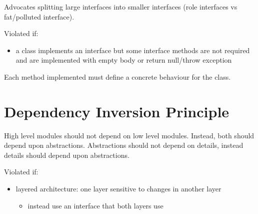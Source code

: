 \documentclass[11pt]{article}
\begin{document}
Advocates splitting large interfaces into smaller interfaces (role interfaces vs
fat/polluted interface).

Violated if:
\begin{itemize}
\item a class implements an interface but some interface methods are not required and are
implemented with empty body or return null/throw exception
\end{itemize}

Each method implemented must define a concrete behaviour for the class.
\section{Dependency Inversion Principle}
\label{sec:org8659b05}
High level modules should not depend on low level modules. Instead, both should depend
upon abstractions.
Abstractions should not depend on details, instead details should depend upon
abstractions.

Violated if:
\begin{itemize}
\item layered architecture: one layer sensitive to changes in another layer
\begin{itemize}
\item instead use an interface that both layers use
\end{itemize}
\end{itemize}
\end{document}
